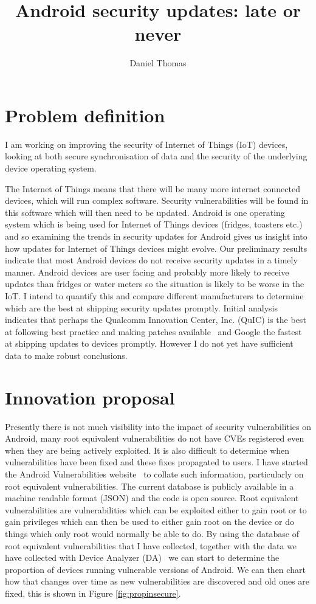 \documentclass[a4paper,twocolumn]{article}
\author{Daniel Thomas}
\title{Android security updates: late or never}
\date{}%
\begin{document}
\maketitle

\section*{Problem definition}
I am working on improving the security of Internet of Things (IoT) devices, looking at both secure synchronisation of data and the security of the underlying device operating system.

The Internet of Things means that there will be many more internet connected devices, which will run complex software.
Security vulnerabilities will be found in this software which will then need to be updated.
Android is one operating system which is being used for Internet of Things devices (fridges, toasters etc.) and so examining the trends in security updates for Android gives us insight into how updates for Internet of Things devices might evolve.
Our preliminary results indicate that most Android devices do not receive security updates in a timely manner.
Android devices are user facing and probably more likely to receive updates than fridges or water meters so the situation is likely to be worse in the IoT.
I intend to quantify this and compare different manufacturers to determine which are the best at shipping security updates promptly.
Initial analysis indicates that perhaps the Qualcomm Innovation Center, Inc. (QuIC) is the best at following best practice and making patches available~\cite{codeaurora-security-advisories} and Google the fastest at shipping updates to devices promptly.
However I do not yet have sufficient data to make robust conclusions.


\section*{Innovation proposal}
Presently there is not much visibility into the impact of security vulnerabilities on Android, many root equivalent vulnerabilities do not have CVEs registered even when they are being actively exploited.
It is also difficult to determine when vulnerabilities have been fixed and these fixes propagated to users.
I have started the Android Vulnerabilities website~\cite{androidvulnerabilities.org} to collate such information, particularly on root equivalent vulnerabilities.
The current database is publicly available in a machine readable format (JSON) and the code is open source.
Root equivalent vulnerabilities are vulnerabilities which can be exploited either to gain root or to gain privileges which can then be used to either gain root on the device or do things which only root would normally be able to do.
By using the database of root equivalent vulnerabilities that I have collected, together with the data we have collected with Device Analyzer (DA)~\cite{Wagner2013} we can start to determine the proportion of devices running vulnerable versions of Android.
We can then chart how that changes over time as new vulnerabilities are discovered and old ones are fixed, this is shown in Figure \ref{fig:propinsecure}.
\end{document}
